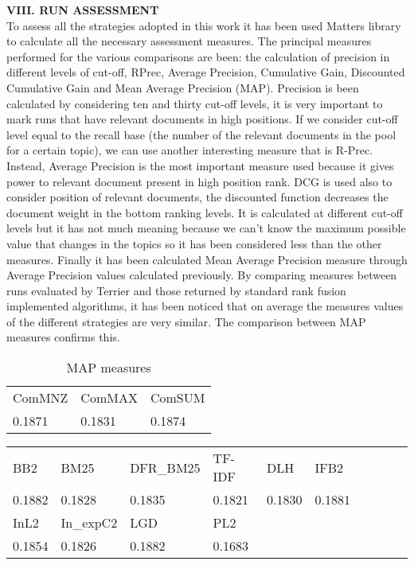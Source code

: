 \documentclass[12pt,journal]{IEEEtran}
\begin{document}
\textbf{VIII.	RUN ASSESSMENT} \\
To assess all the strategies adopted in this work it has been used Matters library to calculate all the necessary assessment measures.
The principal measures performed for the various comparisons are been: the calculation of precision in different levels of cut-off, RPrec, Average Precision, Cumulative Gain, Discounted Cumulative Gain and Mean Average Precision (MAP).
Precision is been calculated by considering ten and thirty cut-off levels, it is very important to mark runs that have relevant documents in high positions. If we consider cut-off level equal to the recall base (the number of the relevant documents in the pool for a certain topic), we can use another interesting measure that is R-Prec.
Instead, Average Precision is the most important measure used because it gives power to relevant document present in high position rank.
DCG is used also to consider position of relevant documents, the discounted function decreases the document weight in the bottom ranking levels. It is calculated at different cut-off levels but it has not much meaning because we can’t know the maximum possible value that changes in the topics so it has been considered less than the other measures. Finally it has been calculated Mean Average Precision measure through Average Precision values calculated previously.
By comparing measures between runs evaluated by Terrier and those returned by standard rank fusion implemented algorithms, it has been noticed that on average the measures values of the different strategies are very similar. The comparison between MAP measures confirms this.

\begin{table}[h!]
\centering
\caption{MAP measures}
\begin{tabular}{|l|l|l|}
\hline
ComMNZ & ComMAX & ComSUM \\
0.1871 & 0.1831 & 0.1874 \\ \hline
\end{tabular}
\end{table}

\begin{table}[h!]
\centering
\begin{tabular}{|l|l|l|l|l|l|l|l|l|l|}
\hline
BB2    & BM25   & DFR\_BM25 & TF-IDF & DLH & IFB2     \\
0.1882 & 0.1828 & 0.1835    & 0.1821 & 0.1830 & 0.1881 \\ \hline
InL2   & In\_expC2 & LGD    & PL2    &        &       \\
0.1854 & 0.1826    & 0.1882 & 0.1683 &        & \\ \hline
\end{tabular}
\end{table}
\end{document}
